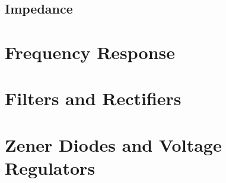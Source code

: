 \documentclass{article}
\begin{document}
\subsection{Impedance}
\newpage
\section{Frequency Response}
\newpage
\section{Filters and Rectifiers}
\newpage
\section{Zener Diodes and Voltage Regulators}
\newpage
\lstlisting
\end{document}
